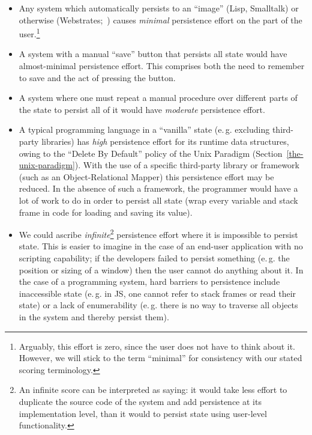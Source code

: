 \documentclass[ twoside,openright,titlepage,numbers=noenddot,headinclude,footinclude,cleardoublepage=empty,abstract=on,
                BCOR=5mm,paper=a4,fontsize=11pt
                ]{scrreprt}
\newcommand{\eg}{e.\,g.}
\providecommand{\tightlist}{}\newenvironment{longtable}[2]{\begin{tabular}}{\end{tabular}}
\theoremstyle{definition}
\begin{document}
\begin{itemize}
\tightlist
\item
  Any system which automatically persists to an ``image'' (Lisp,
  Smalltalk) or otherwise (Webstrates;~\cite{Webstrates}) causes
  \emph{minimal} persistence effort on the part of the user.\footnote{Arguably,
    this effort is zero, since the user does not have to think about it.
    However, we will stick to the term ``minimal'' for consistency with
    our stated scoring terminology.}
\item
  A system with a manual ``save'' button that persists all state would
  have almost-minimal persistence effort. This comprises both the need
  to remember to save and the act of pressing the button.
\item
  A system where one must repeat a manual procedure over different parts
  of the state to persist all of it would have \emph{moderate}
  persistence effort.
\item
  A typical programming language in a ``vanilla'' state (\eg{} excluding
  third-party libraries) has \emph{high} persistence effort for its
  runtime data structures, owing to the ``Delete By Default'' policy of
  the Unix Paradigm (Section~\ref{the-unix-paradigm}). With the use of a
  specific third-party library or framework (such as an
  Object-Relational Mapper) this persistence effort may be reduced. In
  the absence of such a framework, the programmer would have a lot of
  work to do in order to persist all state (wrap every variable and
  stack frame in code for loading and saving its value).
\item
  We could ascribe \emph{infinite}\footnote{An infinite score can be
    interpreted as saying: it would take less effort to duplicate the
    source code of the system and add persistence at its implementation
    level, than it would to persist state using user-level
    functionality.} persistence effort where it is impossible to persist
  state. This is easier to imagine in the case of an end-user
  application with no scripting capability; if the developers failed to
  persist something (\eg{} the position or sizing of a window) then the
  user cannot do anything about it. In the case of a programming system,
  hard barriers to persistence include inaccessible state (\eg{} in
  \ac{JS}, one cannot refer to stack frames or read their state) or a
  lack of enumerability (\eg{} there is no way to traverse all objects
  in the system and thereby persist them).
\end{itemize}
\end{document}
